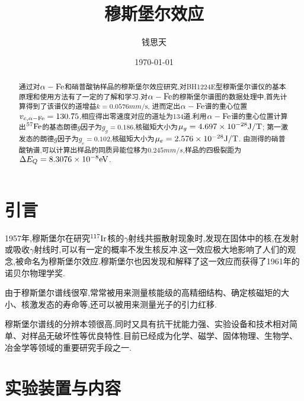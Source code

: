 \documentclass[aps,pre,12pt,preprint,onecolumn,showpacs,showkeys]{revtex4-1}
\begin{document}
\title{\bf\heiti{}穆斯堡尔效应\vspace{15mm}}
\author{\fangsong{}钱思天\vspace{2mm}}
\date{\today}

\begin{abstract}
\vspace{10mm}
\begin{spacing}{1.5}
\songti{}
通过对$\alpha-\rm{Fe}$和硝普酸钠样品的穆斯堡尔效应研究,对BH1224E型穆斯堡尔谱仪的基本原理和使用方法有了一定的了解和学习.对$\alpha-\rm{Fe}$的穆斯堡尔谱图的数据处理中,首先计算得到了该谱仪的道增益$k=\si{\num{0.0576}mm \per \second}$,
进而定出$\alpha-\rm{Fe}$谱的重心位置$v_{c,\alpha-\rm{Fe}}=130.75$,相应得出零速度对应的道址为134道.利用$\alpha-\rm{Fe}$谱的重心位置计算出$^{57}\rm{Fe}$的基态朗德$g$因子为$g_g=0.186$,核磁矩大小为$\mu_g=\si{\num{4.697E-28}J\per T}$;
第一激发态的朗德$g$因子为$g_e=0.102$,核磁矩大小为$\mu_e=\si{\num{2.576E-28 }J\per T}$.
由测得的硝普酸钠谱,可以计算出样品的同质异能位移为$0.245\si{mm\per s}$,样品的四极裂距为$\Delta E_Q=\si{\num{8.3076E-8}eV}$.
\end{spacing}
\end{abstract}
\maketitle
\songti{}

\section{引言}
1957年,穆斯堡尔在研究$^{117}\rm{Ir}$核的$\gamma$射线共振散射现象时,发现在固体中的核,在发射或吸收$\gamma$射线时,可以有一定的概率不发生核反冲.这一效应极大地影响了人们的观念,被命名为穆斯堡尔效应.穆斯堡尔也因发现和解释了这一效应而获得了1961年的诺贝尔物理学奖.
\par
由于穆斯堡尔谱线很窄,常常被用来测量核能级的高精细结构、确定核磁矩的大小、核激发态的寿命等,还可以被用来测量光子的引力红移.
\par
穆斯堡尔谱线的分辨本领很高,同时又具有抗干扰能力强、实验设备和技术相对简单、对样品无破坏性等优良特性.目前已经成为化学、磁学、固体物理、生物学、冶金学等领域的重要研究手段之一.
\section{实验装置与内容}
\end{document}
